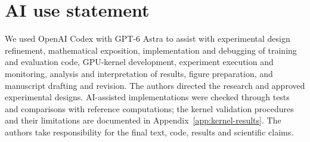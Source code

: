\section*{AI use statement}
We used OpenAI Codex with GPT-6 Astra to assist with experimental
design refinement, mathematical exposition, implementation and debugging
of training and evaluation code, GPU-kernel development, experiment
execution and monitoring, analysis and interpretation of results,
figure preparation, and manuscript drafting and revision.
The authors directed the research and approved experimental designs.
AI-assisted implementations were checked through tests and comparisons
with reference computations; the kernel validation procedures and their
limitations are documented in Appendix~\ref{app:kernel-results}.
The authors take responsibility for the final text, code, results
and scientific claims.

